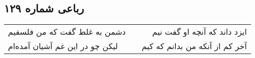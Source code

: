 \begin{center}
\section*{رباعی شماره ۱۲۹}
\label{sec:sh129}
\begin{longtable}{l p{0.5cm} r}
دشمن به غلط گفت که من فلسفیم
&&
ایزد داند که آنچه او گفت نیم
\\
لیکن چو در این غم آشیان آمده‌ام
&&
آخر کم از آنکه من بدانم که کیم
\\
\end{longtable}
\end{center}
